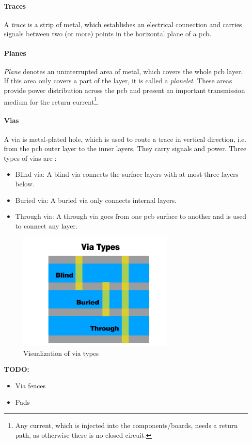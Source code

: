 \paragraph{Traces}
A \textit{trace} is a strip of metal, which establishes an electrical connection and carries signals between two (or more) points in the horizontal plane of a \gls{pcb}. \cite{xilDecouple}


\paragraph{Planes}
\textit{Plane} denotes an uninterrupted area of metal, which covers the whole \gls{pcb} layer. If this area only covers a part of the layer, it is called a \textit{planelet}. These areas provide power distribution across the \gls{pcb} and present an important transmission medium for the return current\footnote{Any current, which is injected into the components/boards, needs a return path, as otherwise there is no closed circuit.}. \cite{xilDecouple}

\paragraph{Vias}
A via is metal-plated hole, which is used to route a trace in vertical direction, i.e. from the \gls{pcb} outer layer to the inner layers. They carry signals and power. Three types of vias are \cite{vias}:
\begin{itemize}
	\item Blind via: A blind via connects the surface layers with at most three layers below.
	\item Buried via: A buried via only connects internal layers.
	\item Through via: A through via goes from one \gls{pcb} surface to another and is used to connect any layer. 
\end{itemize}
\begin{figure}[tbh]
	\centering
	\includegraphics[width = 0.7\textwidth]{chap/04-work/img/vias}
	\caption[Via types]{Visualization of via types \cite{vias}}
	\label{fig:vias}
\end{figure}
\textbf{TODO:} 
	\begin{itemize}
		\item Via fences
		\item Pads
	\end{itemize}

